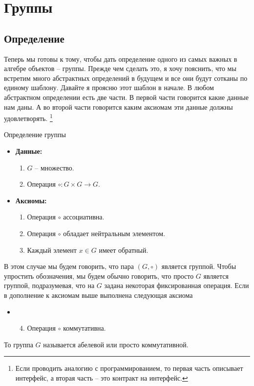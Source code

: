 \section{Группы}

\subsection{Определение}

Теперь мы готовы к тому, чтобы дать определение одного из самых важных в алгебре объектов -- группы.
Прежде чем сделать это, я хочу пояснить, что мы встретим много абстрактных определений в будущем и все они будут сотканы по единому шаблону.
Давайте я проясню этот шаблон в начале.
В любом абстрактном определении есть две части.
В первой части говорится какие данные нам даны.
А во второй части говорится каким аксиомам эти данные должны удовлетворять.%
\footnote{Если проводить аналогию с программированием, то первая часть описывает интерфейс, а вторая часть -- это контракт на интерфейс.}

\begin{definition}
Определение группы
\begin{itemize}
\item\textbf{Данные:} 
\begin{enumerate}
\item $G$ -- множество.

\item Операция $\circ \colon G\times G\to G$.
\end{enumerate}
\item\textbf{Аксиомы:}
\begin{enumerate}
\item Операция $\circ$ ассоциативна.

\item Операция $\circ$ обладает нейтральным элементом.

\item Каждый элемент $x\in G$ имеет обратный.
\end{enumerate}
\end{itemize}
В этом случае мы будем говорить, что пара $(G, \circ)$ является группой.
Чтобы упростить обозначения, мы будем обычно говорить, что просто $G$ является группой, подразумевая, что на $G$ задана некоторая фиксированная операция.
Если в дополнение к аксиомам выше выполнена следующая аксиома
\begin{itemize}
\item[]
\begin{enumerate}
\setcounter{enumi}{3}
\item Операция $\circ$ коммутативна.
\end{enumerate}
\end{itemize}
То группа $G$ называется абелевой или просто коммутативной.
\end{definition}

